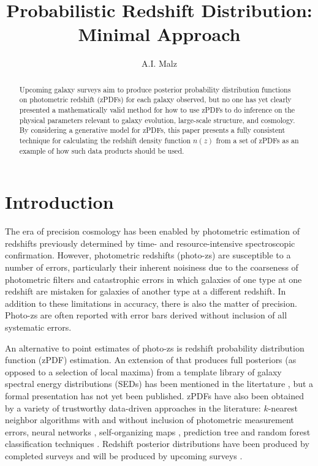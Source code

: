 \documentclass[12pt, onecolumn]{emulateapj}
\begin{document}
\title{Probabilistic Redshift Distribution: Minimal Approach}

\author{A.I. Malz}

\begin{abstract}
Upcoming galaxy surveys aim to produce posterior probability distribution functions on photometric redshift (zPDFs) for each galaxy observed, but no one has yet clearly presented a mathematically valid method for how to use zPDFs to do inference on the physical parameters relevant to galaxy evolution, large-scale structure, and cosmology.  By considering a generative model for zPDFs, this paper presents a fully consistent technique for calculating the redshift density function $n(z)$ from a set of zPDFs as an example of how such data products should be used.  
\end{abstract}


\section{Introduction}

The era of precision cosmology has been enabled by photometric estimation of redshifts previously determined by time- and resource-intensive spectroscopic confirmation.  However, photometric redshifts (photo-zs) are susceptible to a number of errors, particularly their inherent noisiness due to the coarseness of photometric filters and catastrophic errors in which galaxies of one type at one redshift are mistaken for galaxies of another type at a different redshift.  In addition to these limitations in accuracy, there is also the matter of precision.  Photo-zs are often reported with error bars derived without inclusion of all systematic errors.

An alternative to point estimates of photo-zs is redshift probability distribution function (zPDF) estimation.  An extension of \citet{ben00} that produces full posteriors (as opposed to a selection of local maxima) from a template library of galaxy spectral energy distributions (SEDs) has been mentioned in the litertature \citep{lop14}, but a formal presentation has not yet been published.  zPDFs have also been obtained by a variety of trustworthy data-driven approaches in the literature: $k$-nearest neighbor algorithms with \citep{bal08} and without \citep{she11} inclusion of photometric measurement errors, neural networks \citep{bon13}, self-organizing maps \citep{car14}, prediction tree and random forest classification techniques \citep{car13}.  Redshift posterior distributions have been produced by completed surveys \citep{she11} and will be produced by upcoming surveys \citep{abe09}.
\end{document}
